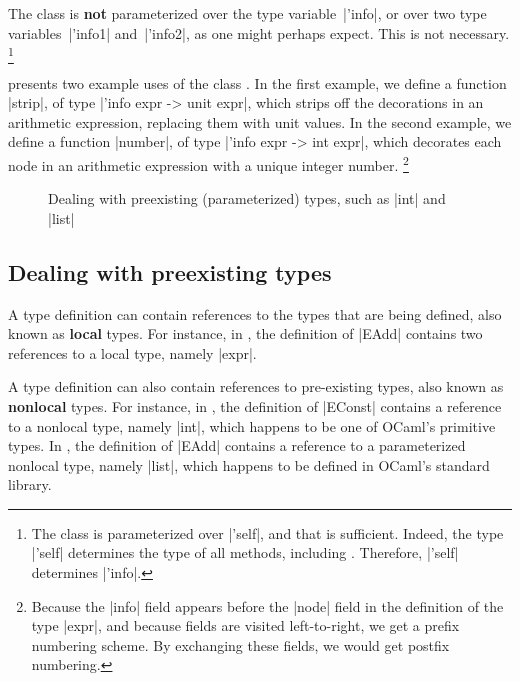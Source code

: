 \documentclass[11pt,a4paper,twoside]{article}
\renewcommand{\emph}[1]{\textbf{#1}}
\begin{document}
The class \map is \emph{not} parameterized over the type variable~\oc|'info|,
or over two type variables~\oc|'info1| and~\oc|'info2|, as one might perhaps
expect. This is not necessary.%
\footnote{The class is parameterized over \oc|'self|, and that is sufficient.
  Indeed, the type \oc|'self| determines the type of all methods, including
  . Therefore, \oc|'self| determines \oc|'info|.}

 presents two example uses of the class \map. In the first
example, we define a function \oc|strip|, of type \oc|'info expr -> unit expr|,
which strips off the decorations in an arithmetic expression, replacing them
with unit values. In the second example, we define a function \oc|number|,
of type \oc|'info expr -> int expr|, which decorates each node in an arithmetic
expression with a unique integer number.%
\footnote{Because the \oc|info| field appears before the \oc|node| field in
  the definition of the type \oc|expr|, and because fields are visited
  left-to-right, we get a prefix numbering scheme. By exchanging these fields,
  we would get postfix numbering.}


\begin{figure}[t]
\vspace{-\baselineskip}
\caption{Dealing with preexisting (parameterized) types, such as \oc|int| and \oc|list|}
\label{fig:expr11}
\end{figure}

\subsection{Dealing with preexisting types}
\label{sec:intro:nonlocal}

A type definition can contain references to the types that are being defined,
also known as \emph{local} types. For instance, in , the
definition of \oc|EAdd| contains two references to a local type, namely
\oc|expr|.

A type definition can also contain references to pre-existing types, also
known as \emph{nonlocal} types. For instance, in , the
definition of \oc|EConst| contains a reference to a nonlocal type, namely
\oc|int|, which happens to be one of OCaml's primitive types. In
, the definition of \oc|EAdd| contains a reference to a
parameterized nonlocal type, namely \oc|list|, which happens to be defined in
OCaml's standard library.
\end{document}
